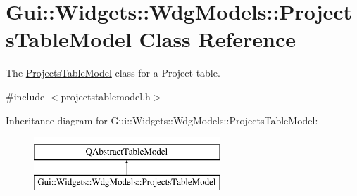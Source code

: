 \hypertarget{classGui_1_1Widgets_1_1WdgModels_1_1ProjectsTableModel}{\section{Gui\-:\-:Widgets\-:\-:Wdg\-Models\-:\-:Projects\-Table\-Model Class Reference}
\label{classGui_1_1Widgets_1_1WdgModels_1_1ProjectsTableModel}
}


The \hyperlink{classGui_1_1Widgets_1_1WdgModels_1_1ProjectsTableModel}{Projects\-Table\-Model} class for a Project table.  




{\ttfamily \#include $<$projectstablemodel.\-h$>$}

Inheritance diagram for Gui\-:\-:Widgets\-:\-:Wdg\-Models\-:\-:Projects\-Table\-Model\-:\begin{figure}[H]
\begin{center}
\leavevmode
\includegraphics[height=2.000000cm]{d3/d40/classGui_1_1Widgets_1_1WdgModels_1_1ProjectsTableModel}
\end{center}
\end{figure}
